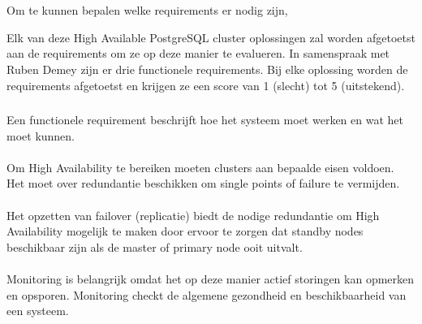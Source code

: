 
\chapter{}
\label{ch:schifting}


\section{}
\label{sec:Requirements}
Om te kunnen bepalen welke requirements er nodig zijn,

Elk van deze High Available PostgreSQL cluster oplossingen zal worden afgetoetst aan de requirements om ze op deze manier te evalueren. In samenspraak met Ruben Demey zijn er drie functionele requirements. Bij elke oplossing worden de requirements afgetoetst en krijgen ze een score van 1 (slecht) tot 5 (uitstekend).

\subsection{}
\label{subsec:Functionele Requirements}
Een functionele requirement beschrijft hoe het systeem moet werken en wat het moet kunnen.

\subsubsection{}
\label{subsubsec:Redundancy}
Om High Availability te bereiken moeten clusters aan bepaalde eisen voldoen. Het moet over redundantie beschikken om single points of failure te vermijden. 


\subsubsection{}
\label{subsubsec:Failover}
Het opzetten van failover (replicatie) biedt de nodige redundantie om High Availability mogelijk te maken door ervoor te zorgen dat standby nodes beschikbaar zijn als de master of primary node ooit uitvalt. 

\subsubsection{}
\label{subsubsec:Monitoring}
Monitoring is belangrijk omdat het op deze manier actief storingen kan opmerken en opsporen. Monitoring checkt de algemene gezondheid en beschikbaarheid van een systeem.


